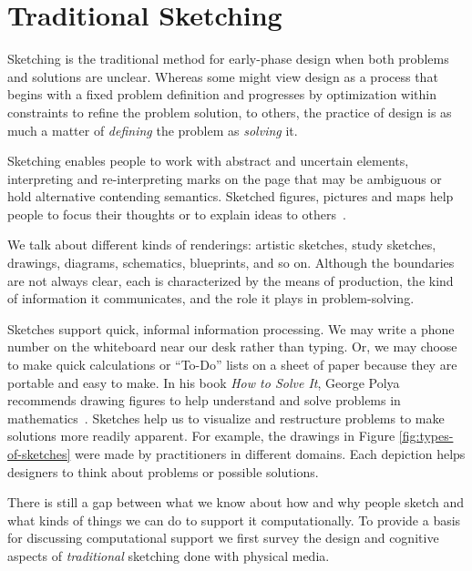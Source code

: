\newpage
\chapter{Traditional Sketching}
\label{sec:traditional}

Sketching is the traditional method for early-phase design when both
problems and solutions are unclear. Whereas some might view design as
a process that begins with a fixed problem definition and progresses
by optimization within constraints to refine the problem solution, to
others, the practice of design is as much a matter of
\textit{defining} the problem as \textit{solving} it.

Sketching enables people to work with abstract and uncertain elements,
interpreting and re-interpreting marks on the page that may be
ambiguous or hold alternative contending semantics. Sketched figures,
pictures and maps help people to focus their thoughts or to explain
ideas to others~\cite{do-design-sketches-tools}.

We talk about different kinds of renderings: artistic sketches, study
sketches, drawings, diagrams, schematics, blueprints, and so
on. Although the boundaries are not always clear, each is
characterized by the means of production, the kind of information it
communicates, and the role it plays in problem-solving.

Sketches support quick, informal information processing. We may write
a phone number on the whiteboard near our desk rather than typing. Or,
we may choose to make quick calculations or ``To-Do'' lists on a sheet
of paper because they are portable and easy to make. In his
book \textit{How to Solve It}, George Polya recommends drawing figures
to help understand and solve problems in
mathematics~\cite{polya-solve}. Sketches help us to visualize and
restructure problems to make solutions more readily apparent. For
example, the drawings in Figure \ref{fig:types-of-sketches} were made
by practitioners in different domains. Each depiction helps designers
to think about problems or possible solutions.

There is still a gap between what we know about how and why people
sketch and what kinds of things we can do to support it
computationally. To provide a basis for discussing computational
support we first survey the design and cognitive aspects
of \textit{traditional} sketching done with physical media.

